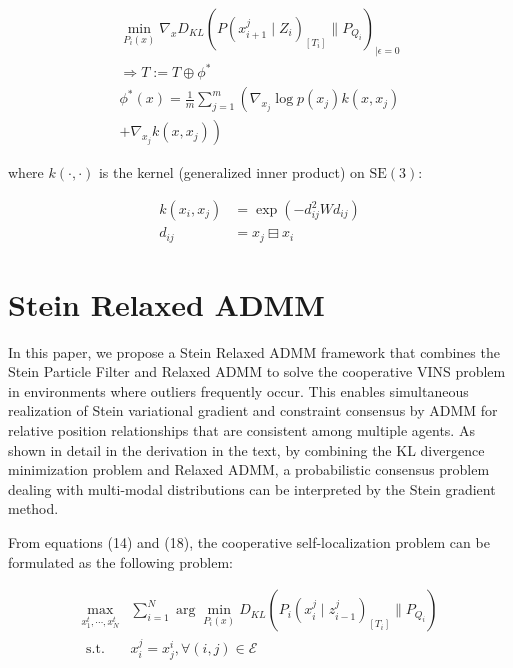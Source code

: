 \documentclass[a4paper,fleqn,10pt,twocolumn]{SICE_ISCS}
\begin{document}
\begin{equation}
\begin{aligned}
\min _{P_{i}(x)} \nabla_{x} D_{K L}\left(P\left(x_{i+1}^{j} \mid Z_{i}\right)_{\left[T_{i}\right]} \| P_{Q_{i}}\right)_{\mid \epsilon=0} \\
\Rightarrow T:=T \oplus \phi^{*} \\
\phi^{*}(x)=\frac{1}{m} \sum_{j=1}^{m}\left(\nabla_{x_{j}} \log p\left(x_{j}\right) k\left(x, x_{j}\right)\right. \\
\left.+\nabla_{x_{j}} k\left(x, x_{j}\right)\right)
\end{aligned}
\end{equation}

where $k(\cdot, \cdot)$ is the kernel (generalized inner product) on $\mathrm{SE}(3)$:

\begin{equation}
\begin{aligned}
k\left(x_{i}, x_{j}\right) & =\exp \left(-d_{i j}^{2} W d_{i j}\right) \\
d_{i j} & =x_{j} \boxminus x_{i}
\end{aligned}
\end{equation}

\section{Stein Relaxed ADMM}
In this paper, we propose a Stein Relaxed ADMM framework that combines the Stein Particle Filter and Relaxed ADMM to solve the cooperative VINS problem in environments where outliers frequently occur. This enables simultaneous realization of Stein variational gradient and constraint consensus by ADMM for relative position relationships that are consistent among multiple agents. As shown in detail in the derivation in the text, by combining the KL divergence minimization problem and Relaxed ADMM, a probabilistic consensus problem dealing with multi-modal distributions can be interpreted by the Stein gradient method.

From equations (14) and (18), the cooperative self-localization problem can be formulated as the following problem:

\begin{equation}
\begin{aligned}
\max _{x_{1}^{t}, \cdots, x_{N}^{t}} & \sum_{i=1}^{N} \arg \min _{P_{i}(x)} D_{K L}\left(P_{i}\left(x_{i}^{j} \mid z_{i-1}^{j}\right)_{\left[T_{i}\right]} \| P_{Q_{i}}\right) \\
\text { s.t. } & x_{i}^{j}=x_{j}^{i}, \forall(i, j) \in \mathcal{E}
\end{aligned}
\end{equation}
\end{document}

